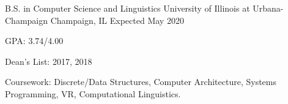 

\begin{cventries}

  \cventry
    {B.S. in Computer Science and Linguistics} %
    {University of Illinois at Urbana-Champaign} %
    {Champaign, IL} %
    {Expected May 2020} %
    {
      \begin{cvitems} %
        \item {GPA: 3.74/4.00}
        \item {Dean's List: 2017, 2018}
        \item {Coursework: Discrete/Data Structures, Computer Architecture, Systems Programming, VR, Computational Linguistics.}%
      \end{cvitems}
    }
    
\end{cventries}
